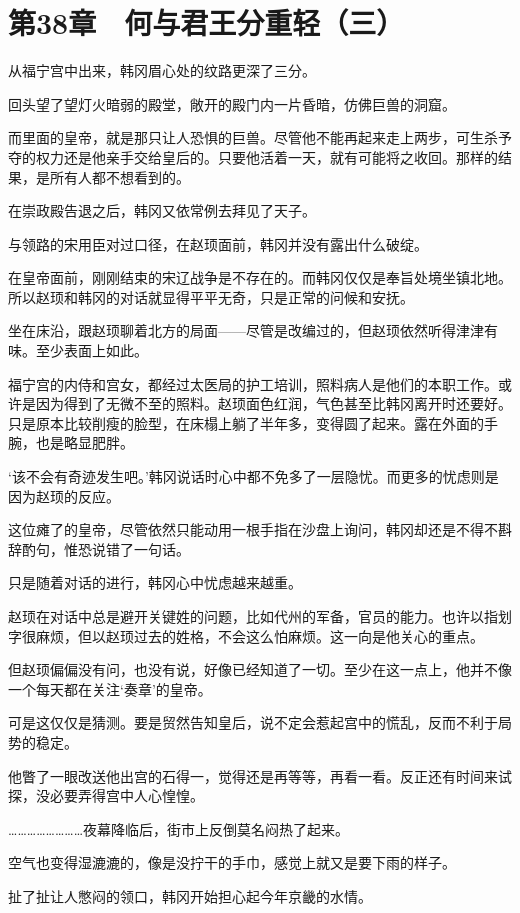 \section{第38章　何与君王分重轻（三）}

从福宁宫中出来，韩冈眉心处的纹路更深了三分。

回头望了望灯火暗弱的殿堂，敞开的殿门内一片昏暗，仿佛巨兽的洞窟。

而里面的皇帝，就是那只让人恐惧的巨兽。尽管他不能再起来走上两步，可生杀予夺的权力还是他亲手交给皇后的。只要他活着一天，就有可能将之收回。那样的结果，是所有人都不想看到的。

在崇政殿告退之后，韩冈又依常例去拜见了天子。

与领路的宋用臣对过口径，在赵顼面前，韩冈并没有露出什么破绽。

在皇帝面前，刚刚结束的宋辽战争是不存在的。而韩冈仅仅是奉旨处境坐镇北地。所以赵顼和韩冈的对话就显得平平无奇，只是正常的问候和安抚。

坐在床沿，跟赵顼聊着北方的局面——尽管是改编过的，但赵顼依然听得津津有味。至少表面上如此。

福宁宫的内侍和宫女，都经过太医局的护工培训，照料病人是他们的本职工作。或许是因为得到了无微不至的照料。赵顼面色红润，气色甚至比韩冈离开时还要好。只是原本比较削瘦的脸型，在床榻上躺了半年多，变得圆了起来。露在外面的手腕，也是略显肥胖。

‘该不会有奇迹发生吧。’韩冈说话时心中都不免多了一层隐忧。而更多的忧虑则是因为赵顼的反应。

这位瘫了的皇帝，尽管依然只能动用一根手指在沙盘上询问，韩冈却还是不得不斟辞酌句，惟恐说错了一句话。

只是随着对话的进行，韩冈心中忧虑越来越重。

赵顼在对话中总是避开关键姓的问题，比如代州的军备，官员的能力。也许以指划字很麻烦，但以赵顼过去的姓格，不会这么怕麻烦。这一向是他关心的重点。

但赵顼偏偏没有问，也没有说，好像已经知道了一切。至少在这一点上，他并不像一个每天都在关注‘奏章’的皇帝。

可是这仅仅是猜测。要是贸然告知皇后，说不定会惹起宫中的慌乱，反而不利于局势的稳定。

他瞥了一眼改送他出宫的石得一，觉得还是再等等，再看一看。反正还有时间来试探，没必要弄得宫中人心惶惶。

……………………夜幕降临后，街市上反倒莫名闷热了起来。

空气也变得湿漉漉的，像是没拧干的手巾，感觉上就又是要下雨的样子。

扯了扯让人憋闷的领口，韩冈开始担心起今年京畿的水情。

